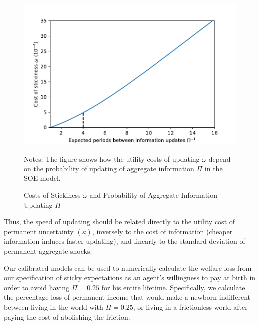 \documentclass[titlepage]{./econtex}
\begin{document}
\begin{figure}
  \centering
\caption{Costs of Stickiness $\omega$ and Probability of Aggregate Information Updating $\Pi$}
\label{costOfStickiness}
{ \includegraphics[width=1.0\textwidth]{./Figures/uCostvsPiInv}}

\footnotesize Notes: The figure shows how the utility costs of updating $\omega$ depend on the probability of updating of aggregate information $\Pi$ in the SOE model.
\end{figure}

Thus, the speed of updating should be related directly to the utility cost of permanent uncertainty $(\kappa)$, inversely to the cost of information (cheaper information induces faster updating), and linearly to the standard deviation of permanent aggregate shocks.

Our calibrated models can be used to numerically calculate the welfare loss from our specification of sticky expectations as an agent's willingness to pay at birth in order to avoid having $\Pi=0.25$ for his entire lifetime. Specifically, we calculate the percentage loss of permanent income that would make a newborn indifferent between living in the world with $\Pi=0.25$, or living in a frictionless world after paying the cost of abolishing the friction.  
\end{document}
